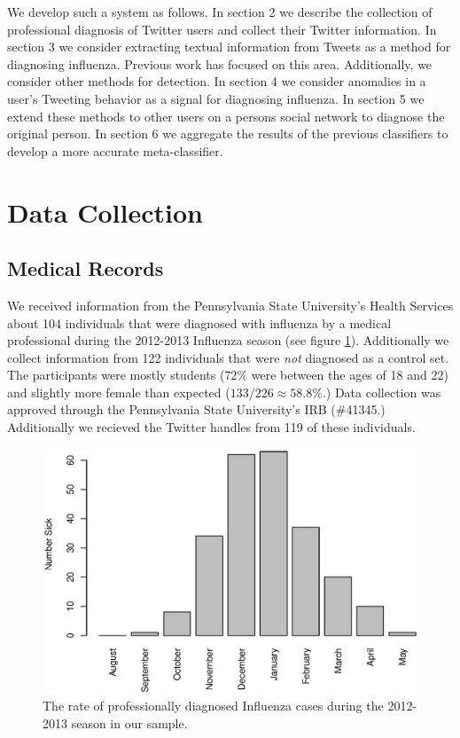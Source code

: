 \documentclass{acm_proc_article-sp}
\begin{document}
We develop such a system as follows. In section 2 we describe the collection of professional diagnosis of Twitter users and collect their Twitter information. In section 3 we consider extracting textual information from Tweets as a method for diagnosing influenza. Previous work has focused on this area. Additionally, we consider other methods for detection. In section 4 we consider anomalies in a user's Tweeting behavior as a signal for diagnosing influenza. In section 5 we extend these methods to other users on a persons social network to diagnose the original person. In section 6 we aggregate the results of the previous classifiers to develop a more accurate meta-classifier.






\section{Data Collection}
\subsection{Medical Records}
We received information from the Pennsylvania State University's Health Services about 104 individuals that were diagnosed with influenza by a medical professional during the 2012-2013 Influenza season (see figure \ref{fig:flu_rate}).  Additionally we collect information from 122 individuals that were \emph{not} diagnosed as a control set. The participants were mostly students (\(72\%\) were between the ages of 18 and 22) and slightly more female than expected (\(133 / 226 \approx 58.8\%\).) Data collection was approved through the Pennsylvania State University's IRB (\#41345.) Additionally we recieved the Twitter handles from 119 of these individuals.

\begin{figure} [h]
\centering
\includegraphics[width=.45\textwidth]{figs/sick_count.eps}
\caption{The rate of professionally diagnosed Influenza cases during the 2012-2013 season in our sample.}
\label{fig:flu_rate}
\end{figure}
\end{document}
